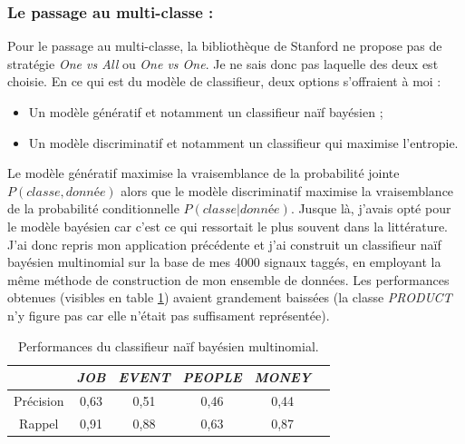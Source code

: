             \subsubsection{Le passage au multi-classe :}
                Pour le passage au multi-classe, la bibliothèque de Stanford ne propose pas de stratégie \textit{One vs All} ou \textit{One vs One}. Je ne sais donc pas laquelle des deux est choisie. En ce qui est du modèle de classifieur, deux options s'offraient à moi :
                \begin{itemize}
                    \item Un modèle génératif et notamment un classifieur naïf bayésien ;
                    \item Un modèle discriminatif et notamment un classifieur qui maximise l'entropie.
                \end{itemize}
                Le modèle génératif maximise la vraisemblance de la probabilité jointe $P(classe, donnée)$ alors que le modèle discriminatif maximise la vraisemblance de la probabilité conditionnelle $P(classe | donnée)$. Jusque là, j'avais opté pour le modèle bayésien car c'est ce qui ressortait le plus souvent dans la littérature. J'ai donc repris mon application précédente et j'ai construit un classifieur naïf bayésien multinomial sur la base de mes 4000 signaux taggés, en employant la même méthode de construction de mon ensemble de données. Les performances obtenues (visibles en table \ref{tab:classif_perf2}) avaient grandement baissées (la classe \textit{PRODUCT} n'y figure pas car elle n'était pas suffisament représentée).
                \begin{table}[h]
                    \centering
                    \begin{tabular}{| c | c | c | c | c | c |}
                        \hline
                         & \textit{JOB} & \textit{EVENT} & \textit{PEOPLE} & \textit{MONEY} \\
                        \hline
                        Précision & 0,63 & 0,51 & 0,46 & 0,44 \\
                        Rappel & 0,91 & 0,88 & 0,63 & 0,87 \\
                        \hline
                    \end{tabular}
                    \caption{Performances du classifieur naïf bayésien multinomial.}
                    \label{tab:classif_perf2}
                \end{table}

